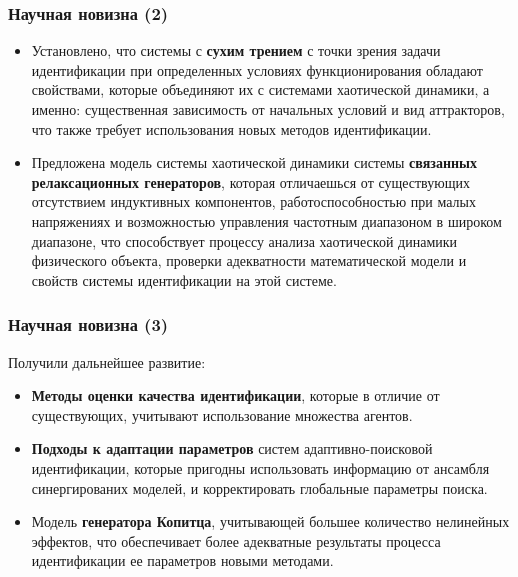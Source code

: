\documentclass[10pt,utf8]{beamer}
\begin{document}

\begin{frame}
  \frametitle{Научная новизна (2)}

  \begin{itemize}

    \item
      Установлено, что системы с \textbf{сухим трением} с точки зрения задачи идентификации при
      определенных условиях функционирования обладают свойствами, которые объединяют их с
      системами хаотической динамики, а именно:
      существенная зависимость от начальных условий и вид аттракторов, что
      также требует использования новых методов идентификации.

    \item
      Предложена модель системы хаотической динамики системы
      \textbf{связанных релаксационных генераторов},
      которая отличаешься от существующих отсутствием индуктивных
      компонентов, работоспособностью при малых напряжениях и возможностью управления
      частотным диапазоном в широком диапазоне, что способствует процессу анализа
      хаотической динамики физического объекта, проверки адекватности математической
      модели и свойств системы идентификации на этой системе.

  \end{itemize}

\end{frame}




\begin{frame}
  \frametitle{Научная новизна (3)}

\noindent
Получили дальнейшее развитие:

  \begin{itemize}

    \item
      \textbf{Методы оценки качества идентификации},
      которые в отличие от существующих,
      учитывают использование множества агентов.

    \item
      \textbf{Подходы к адаптации параметров}
      систем адаптивно-поисковой идентификации,
      которые пригодны использовать информацию от ансамбля синергированих моделей, и
      корректировать глобальные параметры поиска.

    \item
      Модель \textbf{генератора Копитца}, учитывающей большее количество нелинейных эффектов,
      что обеспечивает более адекватные результаты процесса идентификации ее
      параметров новыми методами.

  \end{itemize}


\end{frame}
\end{document}
